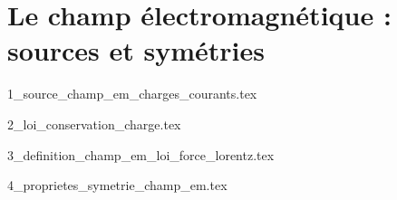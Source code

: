 \chapter[Le champ électromagnétique]{Le champ électromagnétique : sources et symétries}

\minitoc

{1_source_champ_em_charges_courants.tex}

{2_loi_conservation_charge.tex}

{3_definition_champ_em_loi_force_lorentz.tex}

{4_proprietes_symetrie_champ_em.tex}